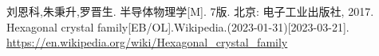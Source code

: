 \begin{thebibliography}{99}%
     刘恩科,朱秉升,罗晋生. 半导体物理学[M]. 7版. 北京: 电子工业出版社, 2017.
     Hexagonal crystal family[EB/OL].Wikipedia.(2023-01-31)[2023-03-21].\\\url{https://en.wikipedia.org/wiki/Hexagonal_crystal_family}
\end{thebibliography}
